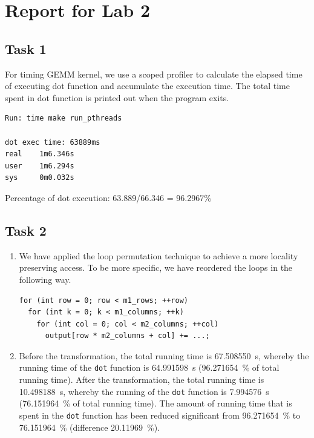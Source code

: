 \documentclass[a4paper, DIV12, headsepline]{scrartcl}
\begin{document}
\section*{Report for Lab 2}
\subsection*{Task 1}
For timing GEMM kernel, we use a scoped profiler to calculate the elapsed time of executing dot function and accumulate the execution time. The total time spent in dot function is printed out when the program exits.
\begin{verbatim}  
Run: time make run_pthreads  

dot exec time: 63889ms
real    1m6.346s
user    1m6.294s
sys     0m0.032s
\end{verbatim}
Percentage of dot execution: 63.889/66.346 = 96.2967\%

\subsection*{Task 2}
\begin{enumerate}[label=\alph*)]
\item We have applied the loop permutation technique to achieve a more locality preserving access. To be more specific, we have reordered the loops in the following way.
\begin{verbatim}
for (int row = 0; row < m1_rows; ++row)
  for (int k = 0; k < m1_columns; ++k)
    for (int col = 0; col < m2_columns; ++col)
      output[row * m2_columns + col] += ...;
\end{verbatim}

\item Before the transformation, the total running time is \SI{67.508550}{s}, whereby the running time of the \texttt{dot} function is \SI{64.991598}{s} (\SI{96.271654}{\%} of total running time). After the transformation, the total running time is \SI{10.498188}{s}, whereby the running of the \texttt{dot} function is \SI{7.994576}{s} (\SI{76.151964}{\%} of total running time). The amount of running time that is spent in the \texttt{dot} function has been reduced significant from \SI{96.271654}{\%} to \SI{76.151964}{\%} (difference \SI{20.11969}{\%}).
\end{enumerate}

\end{document}
